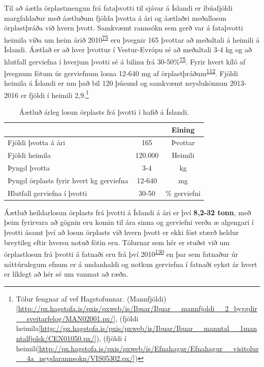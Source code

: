 \documentclass[icelandic,]{book}
\let\rmarkdownfootnote\footnote%
\def\footnote{\protect\rmarkdownfootnote}
\begin{document}
Til að áætla örplastmengun frá fataþvotti til sjávar á Íslandi er íbúafjöldi margfaldaður með áætluðum fjölda þvotta á ári og áætlaðri meðallosun örplastþráða við hvern þvott. Samkvæmt rannsókn sem gerð var á fataþvotti heimila víða um heim árið 2010\textsuperscript{\protect\hyperlink{ref-Pakula2010}{75}} eru þvegnir 165 þvottar að meðaltali á heimili á Íslandi. Áætlað er að hver þvottur í Vestur-Evrópu sé að meðaltali 3-4 kg og að hlutfall gerviefna í hverjum þvotti sé á bilinu frá 30-50\%\textsuperscript{\protect\hyperlink{ref-Pakula2010}{75}}. Fyrir hvert kíló af þvegnum fötum úr gerviefnum losna 12-640 mg af örplastþráðum\textsuperscript{\protect\hyperlink{ref-magnusson2016swedish}{112}}. Fjöldi heimila á Íslandi er um það bil 120 þúsund og samkvæmt neyslukönnun 2013-2016 er fjöldi í heimili 2,9.\footnote{Tölur fengnar af vef Hagstofunnar. (Mannfjöldi){[}\url{http://px.hagstofa.is/pxis/pxweb/is/Ibuar/Ibuar__mannfjoldi__2_byggdir__sveitarfelog/MAN02001.px/}{]}, (fjöldi heimila{[}\url{http://px.hagstofa.is/pxis/pxweb/is/Ibuar/Ibuar__manntal__1manntalfjolsk/CEN01050.px/}{]}), (fjöldi í heimili{[}\url{http://px.hagstofa.is/pxis/pxweb/is/Efnahagur/Efnahagur__visitolur__4a_neyslarannsokn/VIS05302.px/}{]})}

\begin{table}[t]

\caption{\label{tab:unnamed-chunk-12}Áætluð árleg losun örplasts frá þvotti í hafið á Íslandi.}
\centering
\begin{tabular}{lcc}
\toprule
  &  & Eining\\
\midrule
\rowcolor{gray!6} Fjöldi þvotta á ári & 165 & Þvottar\\
Fjöldi heimila & 120.000 & Heimili\\
\rowcolor{gray!6} Þyngd þvotta & 3-4 & kg\\
Þyngd örplasts fyrir hvert kg gerviefna & 12-640 & mg\\
\rowcolor{gray!6} Hlutfall gerviefna í þvotti & 30-50 & \% gerviefni\\
\bottomrule
\end{tabular}
\end{table}

Áætluð heildarlosun örplasts frá þvotti á Íslandi á ári er því \textbf{8,2-32 tonn}, með þeim fyrirvara að gögnin eru komin til ára sinna og gerviefni verða æ algengari í þvotti ásamt því að losun örplasts við hvern þvott er ekki föst stærð heldur breytileg eftir hversu notuð fötin eru. Tölurnar sem hér er stuðst við um örplastlosun frá þvotti á fatnaði eru frá því 2010\textsuperscript{\protect\hyperlink{ref-pakula2010electricity}{130}} en þar sem fatnaður úr náttúrulegum efnum er á undanhaldi og notkun gerviefna í fatnaði eykst ár hvert er líklegt að hér sé um vanmat að ræða.
\end{document}
